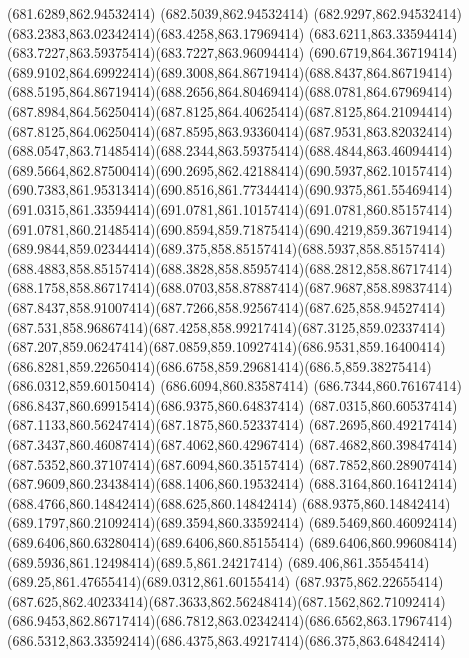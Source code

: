 {{	\lineto(681.6289,862.94532414)
	\lineto(682.5039,862.94532414)
	\curveto(682.9297,862.94532414)(683.2383,863.02342414)(683.4258,863.17969414)
	\curveto(683.6211,863.33594414)(683.7227,863.59375414)(683.7227,863.96094414)
	\closepath
	\moveto(690.6719,864.36719414)
	\curveto(689.9102,864.69922414)(689.3008,864.86719414)(688.8437,864.86719414)
	\curveto(688.5195,864.86719414)(688.2656,864.80469414)(688.0781,864.67969414)
	\curveto(687.8984,864.56250414)(687.8125,864.40625414)(687.8125,864.21094414)
	\curveto(687.8125,864.06250414)(687.8595,863.93360414)(687.9531,863.82032414)
	\curveto(688.0547,863.71485414)(688.2344,863.59375414)(688.4844,863.46094414)
	\curveto(689.5664,862.87500414)(690.2695,862.42188414)(690.5937,862.10157414)
	\curveto(690.7383,861.95313414)(690.8516,861.77344414)(690.9375,861.55469414)
	\curveto(691.0315,861.33594414)(691.0781,861.10157414)(691.0781,860.85157414)
	\curveto(691.0781,860.21485414)(690.8594,859.71875414)(690.4219,859.36719414)
	\curveto(689.9844,859.02344414)(689.375,858.85157414)(688.5937,858.85157414)
	\curveto(688.4883,858.85157414)(688.3828,858.85957414)(688.2812,858.86717414)
	\curveto(688.1758,858.86717414)(688.0703,858.87887414)(687.9687,858.89837414)
	\curveto(687.8437,858.91007414)(687.7266,858.92567414)(687.625,858.94527414)
	\curveto(687.531,858.96867414)(687.4258,858.99217414)(687.3125,859.02337414)
	\curveto(687.207,859.06247414)(687.0859,859.10927414)(686.9531,859.16400414)
	\curveto(686.8281,859.22650414)(686.6758,859.29681414)(686.5,859.38275414)
	\lineto(686.0312,859.60150414)
	\lineto(686.6094,860.83587414)
	\curveto(686.7344,860.76167414)(686.8437,860.69915414)(686.9375,860.64837414)
	\curveto(687.0315,860.60537414)(687.1133,860.56247414)(687.1875,860.52337414)
	\curveto(687.2695,860.49217414)(687.3437,860.46087414)(687.4062,860.42967414)
	\curveto(687.4682,860.39847414)(687.5352,860.37107414)(687.6094,860.35157414)
	\curveto(687.7852,860.28907414)(687.9609,860.23438414)(688.1406,860.19532414)
	\curveto(688.3164,860.16412414)(688.4766,860.14842414)(688.625,860.14842414)
	\curveto(688.9375,860.14842414)(689.1797,860.21092414)(689.3594,860.33592414)
	\curveto(689.5469,860.46092414)(689.6406,860.63280414)(689.6406,860.85155414)
	\curveto(689.6406,860.99608414)(689.5936,861.12498414)(689.5,861.24217414)
	\curveto(689.406,861.35545414)(689.25,861.47655414)(689.0312,861.60155414)
	\lineto(687.9375,862.22655414)
	\curveto(687.625,862.40233414)(687.3633,862.56248414)(687.1562,862.71092414)
	\curveto(686.9453,862.86717414)(686.7812,863.02342414)(686.6562,863.17967414)
	\curveto(686.5312,863.33592414)(686.4375,863.49217414)(686.375,863.64842414)
}}
